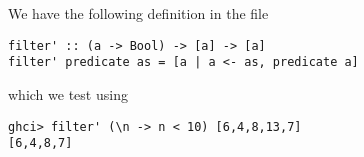 
We have the following definition in the file 
\begin{verbatim}
filter' :: (a -> Bool) -> [a] -> [a]
filter' predicate as = [a | a <- as, predicate a]
\end{verbatim}
which we test using
\begin{verbatim}
ghci> filter' (\n -> n < 10) [6,4,8,13,7]
[6,4,8,7]
\end{verbatim}


